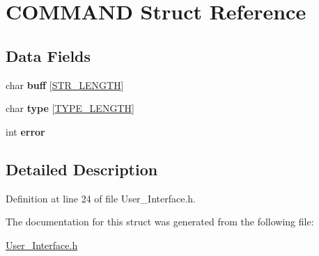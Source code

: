 \hypertarget{struct_c_o_m_m_a_n_d}{}\section{C\+O\+M\+M\+A\+ND Struct Reference}
\label{struct_c_o_m_m_a_n_d}
\subsection*{Data Fields}
\begin{DoxyCompactItemize}
\item 
\mbox{\label{struct_c_o_m_m_a_n_d_a3ca56d05670fa13929584cd8aebae252}} 
char {\bfseries buff} \mbox{[}\hyperlink{_a_p_i___i_o_8h_a9e8aaf9c28f704136d8fc1ba043b6bf5}{S\+T\+R\+\_\+\+L\+E\+N\+G\+TH}\mbox{]}
\item 
\mbox{\label{struct_c_o_m_m_a_n_d_a106c2825d202a4530656fcd385d0c04b}} 
char {\bfseries type} \mbox{[}\hyperlink{_a_p_i___i_o_8h_a7be6924e0d85f3f82149ea31cca36887}{T\+Y\+P\+E\+\_\+\+L\+E\+N\+G\+TH}\mbox{]}
\item 
\mbox{\label{struct_c_o_m_m_a_n_d_a11614f44ef4d939bdd984953346a7572}} 
int {\bfseries error}
\end{DoxyCompactItemize}


\subsection{Detailed Description}


Definition at line 24 of file User\+\_\+\+Interface.\+h.



The documentation for this struct was generated from the following file\+:\begin{DoxyCompactItemize}
\item 
\hyperlink{_user___interface_8h}{User\+\_\+\+Interface.\+h}\end{DoxyCompactItemize}
